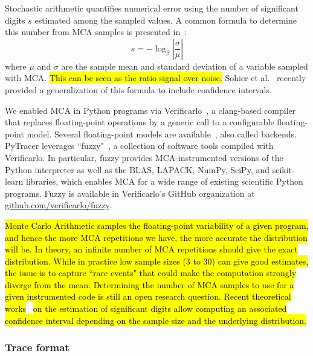 \documentclass[10pt,journal,compsoc]{IEEEtran}
\newcommand{\pytracer}[0]{PyTracer\xspace}
\DeclareRobustCommand{\add}[1]{\sethlcolor{lightgreen}\hl{#1}}
\begin{document}
Stochastic arithmetic quantifies numerical error using the number of significant
digits $s$ estimated among the sampled values. A common formula to determine
this number from MCA samples is presented in~\cite{parker1997monte}:
\begin{equation}
    s = -\log_{\beta}{ \left| \dfrac{\sigma}{\mu} \right|} \label{eq:sig-digits}
\end{equation}
where $\mu$ and $\sigma$ are the sample mean and standard deviation of a
variable sampled with MCA. \add{This can be seen as the ratio signal over noise.}
Sohier et al.~\cite{sohier2021confidence} recently provided a generalization of
this formula to include confidence intervals.

We enabled MCA in Python programs via Verificarlo~\cite{verificarlo}, a
clang-based compiler~\cite{lattner2008llvm} that replaces floating-point
operations by a generic call to a configurable floating-point model. Several
floating-point models are
available~\cite{chatelain2019automatic,chatelain2019outils}, also called
backends. \pytracer leverages ``fuzzy"~\cite{kiar2020comparing}, a collection of
software tools compiled with Verificarlo. In particular, fuzzy provides
MCA-instrumented versions of the Python interpreter as well as the BLAS, LAPACK,
NumPy, SciPy, and scikit-learn libraries, which enables MCA for a wide range of
existing scientific Python programs. Fuzzy is available in Verificarlo's GitHub
organization at
\href{https://github.com/verificarlo/fuzzy}{\url{github.com/verificarlo/fuzzy}}.


\add{Monte Carlo Arithmetic samples the floating-point variability of a given
    program, and hence the more MCA repetitions we have, the more accurate the
    distribution will be. In theory, an infinite number of MCA repetitions
    should give the exact distribution. While in practice low sample sizes (3 to 30)
    can give good estimates, the issue is to capture ``rare events" that could make the
    computation strongly diverge from the mean. Determining the number of
    MCA samples to use for a given instrumented code is still an open research question. 
    Recent theoretical works}~\cite{sohier2021confidence}
\add{on the estimation of significant digits allow computing an associated
    confidence interval depending on the sample size and the underlying distribution.}

\subsubsection{Trace format}
\end{document}
